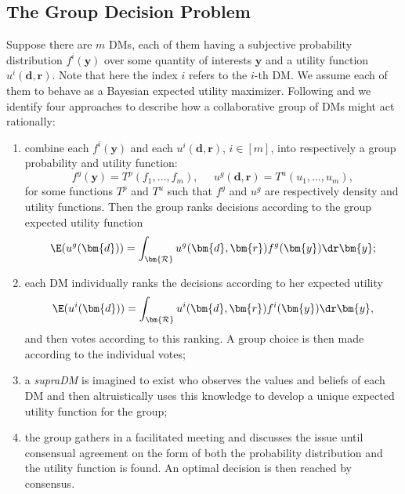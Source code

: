 \subsection{The Group Decision Problem}
\label{sec:groupdecprob}
Suppose there are $m$ \glspl{DM}, each of them having a subjective probability distribution $f^i(\bm{y})$ over some quantity of interests $\bm{y}$ and a utility function $u^i(\bm{d},\bm{r})$. Note that here the index $i$ refers to the $i$-th \gls{DM}. We assume each of them to behave as a Bayesian expected utility maximizer. Following \citet{French2009} and  \citet{French2011} we identify four approaches to describe how a collaborative group of \glspl{DM} might act rationally:
\begin{enumerate}
\item combine each $f^i(\bm{y})$ and each $u^i(\bm{d},\bm{r})$, $i\in [m]$, into respectively a group probability and utility function:
\begin{equation*}
f^g(\bm{y})=T^p(f_1,\dots,f_m),\;\;\;\;\; u^g(\bm{d},\bm{r})=T^u(u_1,\dots,u_m),
\label{eq:approach11}
\end{equation*}
for some functions $T^p$ and $T^u$ such that $f^g$ and $u^g$ are respectively density and utility functions. Then the group ranks decisions according to the group expected utility function
\begin{equation*}
\label{eq:approach12}
\E(u^g(\bm{d}))=\int_{\bm{\mathcal{R}}} u^g(\bm{d},\bm{r})f^g(\bm{y})\dr \bm{y};
\end{equation*}
\item each \gls{DM} individually ranks the decisions according to her expected utility 
\begin{equation*}
\label{eq:approach2}
\E(u^i(\bm{d}))=\int_{\bm{\mathcal{R}}} u^i(\bm{d},\bm{r})f^i(\bm{y})\dr \bm{y},
\end{equation*}
and then votes according to this ranking. A group choice is then made according to the individual votes;
\item a \textit{supra\gls{DM}} is imagined to exist who observes the values and beliefs of each \gls{DM} and then altruistically uses this knowledge to develop a unique expected utility function for the group;
\item the group gathers in a facilitated meeting and discusses the issue until consensual agreement on the form of both the probability distribution and the utility function is found. An optimal decision is then reached by consensus.
\end{enumerate}

